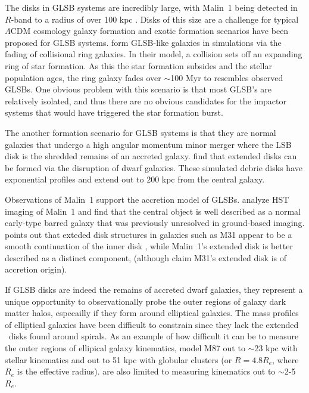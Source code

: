 \documentclass[12pt,preprint]{aastex}
\newcommand\HI{\ion{H}{1}}
\begin{document}
The disks in GLSB systems are incredibly large, with Malin~1 being detected in $R$-band to a radius of over 100 kpc \citep{Moore06}.  Disks of this size are a challenge for typical $\Lambda$CDM cosmology galaxy formation and exotic formation scenarios have been proposed for GLSB systems.  \citet{Mapelli08} form GLSB-like galaxies in simulations via the fading of collisional ring galaxies.  In their model, a collision sets off an expanding ring of star formation.  As this the star formation subsides and the stellar population ages, the ring galaxy fades over $\sim$100 Myr to resembles observed GLSBs.  One obvious problem with this scenario is that most GLSB's are relatively isolated, and thus there are no obvious candidates for the impactor systems that would have triggered the star formation burst.  

The another formation scenario for GLSB systems is that they are normal galaxies that undergo a high angular momentum minor merger where the LSB disk is the shredded remains of an accreted galaxy.  \citet{Pen06} find that extended disks can be formed via the disruption of dwarf galaxies.  These simulated debrie disks have exponential profiles and extend out to 200 kpc from the central galaxy.

Observations of Malin~1 support the accretion model of GLSBs.  \citet{Barth07} analyze HST imaging of Malin~1 and find that the central object is well described as a normal early-type barred galaxy that was previously unresolved in ground-based imaging. \citet{Barth07} points out that exteded disk structures in galaxies such as M31 appear to be a smooth continuation of the inner disk \citep{Ferguson02}, while Malin~1's extended disk is better described as a distinct component, (although \citet{Ibata05} claim M31's extended disk is of accretion origin).


If GLSB disks are indeed the remains of accreted dwarf galaxies, they represent a unique opportunity to observationally probe the outer regions of galaxy dark matter halos, especailly if they form around elliptical galaxies.  The mass profiles of elliptical galaxies have been difficult to constrain since they lack the extended \HI\ disks found around spirals.  As an example of how difficult it can be to measure the outer regions of ellipical galaxy kinematics, \citet{Murphy2011} model M87 out to $\sim$23 kpc with stellar kinematics and out to 51 kpc with globular clusters (or $R=4.8 R_e$, where $R_e$ is the effective radius). \citet{Raskutti14} are also limited to measuring kinematics out to $\sim$2-5 $R_e$.  
\end{document}
